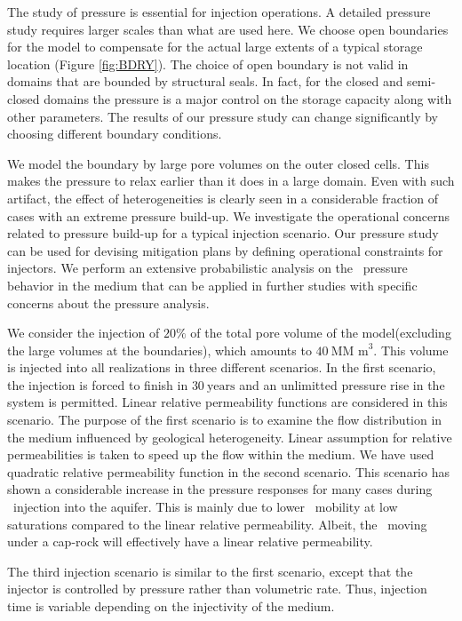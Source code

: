The study of pressure is essential for injection operations. A detailed pressure study requires larger scales than what are used here. We choose open boundaries for the model to compensate for the actual large extents of a typical storage location (Figure \ref{fig:BDRY}). The choice of open boundary is not valid in domains that are bounded by structural seals. In fact, for the closed and semi-closed domains the pressure is a major control on the storage capacity along with other parameters. The results of our pressure study can change significantly by choosing different boundary conditions. 

We model the boundary by large pore volumes on the outer closed cells. This makes the pressure to relax earlier than it does in a large domain. Even with such artifact, the effect of heterogeneities is clearly seen in a considerable fraction of cases with an extreme pressure build-up. We investigate the operational concerns  related to pressure build-up for a typical injection scenario. Our pressure study can be used for devising mitigation plans by defining operational constraints for injectors. We perform an extensive probabilistic analysis on the \coo\ pressure behavior in the medium that can be applied in further studies with specific concerns about the pressure analysis.   

We consider the injection of $20\%$ of the total pore volume of the model(excluding the large volumes at the boundaries), which amounts to $40~\mbox{MM m}^3$. This volume is injected into all realizations
in three different scenarios. In the first scenario, the injection is forced to
finish in
$30~\mbox{years}$ and an unlimitted pressure rise in the system is permitted. Linear relative permeability functions are considered in this
scenario. The purpose of the first scenario is to examine the flow distribution in the medium influenced by geological heterogeneity. Linear assumption for
relative permeabilities is taken to speed up the flow within the medium. We have used quadratic relative permeability function in the second scenario. This scenario has shown a considerable increase in the pressure responses for many cases during \coo\ injection into the  aquifer. This is mainly due to lower \coo\ mobility at low saturations compared to the linear relative permeability. Albeit, the \coo\ moving under a cap-rock will effectively have a linear relative permeability.

The third injection scenario is similar to the first scenario, except that the injector is controlled by pressure rather than volumetric rate. Thus, injection time is variable depending on the injectivity of the medium.

